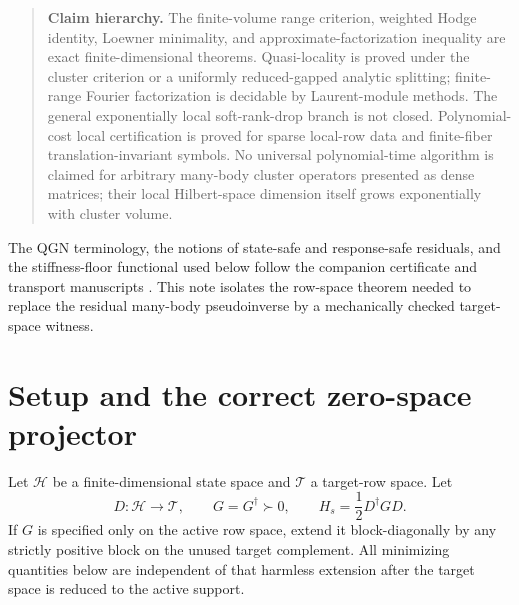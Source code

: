 \documentclass[11pt]{article}
\theoremstyle{definition}
\theoremstyle{remark}
\newcommand{\cH}{\mathcal H}
\newcommand{\cT}{\mathcal T}
\begin{document}
\begin{quote}\small
\textbf{Claim hierarchy.}
The finite-volume range criterion, weighted Hodge identity, Loewner minimality, and approximate-factorization inequality are exact finite-dimensional theorems.  Quasi-locality is proved under the cluster criterion or a uniformly reduced-gapped analytic splitting; finite-range Fourier factorization is decidable by Laurent-module methods.  The general exponentially local soft-rank-drop branch is not closed.  Polynomial-cost local certification is proved for sparse local-row data and finite-fiber translation-invariant symbols.  No universal polynomial-time algorithm is claimed for arbitrary many-body cluster operators presented as dense matrices; their local Hilbert-space dimension itself grows exponentially with cluster volume.
\end{quote}

The QGN terminology, the notions of state-safe and response-safe residuals, and the stiffness-floor functional used below follow the companion certificate and transport manuscripts \cite{QGNFunctional,PeierlsEscape,MicroscopicTransfer,ZeroFrequency}.  This note isolates the row-space theorem needed to replace the residual many-body pseudoinverse by a mechanically checked target-space witness.

\section{Setup and the correct zero-space projector}

Let $\cH$ be a finite-dimensional state space and $\cT$ a target-row space.  Let
\begin{equation}
 D:\cH\longrightarrow\cT,
 \qquad
 G=G^\dagger\succ0,
 \qquad
 H_s=\frac12D^\dagger GD.
 \label{eq:setup}
\end{equation}
If $G$ is specified only on the active row space, extend it block-diagonally by any strictly positive block on the unused target complement.  All minimizing quantities below are independent of that harmless extension after the target space is reduced to the active support.
\end{document}
